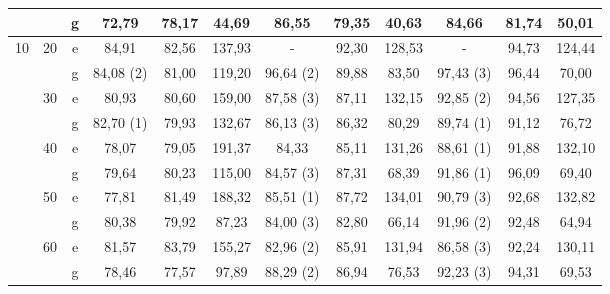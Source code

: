 \begin{table}[!h]
{\begin{tabular}{|c|c|c||ccc|ccc|ccc|}
          &       & g     & 	72,79  & 78,17 & 44,69 & 	86,55  & 79,35 & 40,63 & 	84,66 & 81,74 & 50,01 \bigstrut[b]\\
    \hline
    \hline
    \multirow{10}[10]{*}{10} & \multirow{2}[2]{*}{20} & e     & 	84,91  & 82,56 & 137,93 & \textcolor[rgb]{ 1,  0,  0}{ - } & 92,30 & 128,53 & \textcolor[rgb]{ 1,  0,  0}{ -} & 94,73 & 124,44 \bigstrut[t]\\
          &       & g     & \textcolor[rgb]{ 1,  0,  0}{ 84,08 (2) } & 81,00 & 119,20 & \textcolor[rgb]{ 1,  0,  0}{ 96,64 (2) } & 89,88 & 83,50 & \textcolor[rgb]{ 1,  0,  0}{ 97,43 (3)} & 96,44 & 70,00 \bigstrut[b]\\
\cline{2-12}          & \multirow{2}[2]{*}{30} & e     &  80,93  & 80,60 & 159,00 & \textcolor[rgb]{ 1,  0,  0}{ 87,58 (3) } & 87,11 & 132,15 & \textcolor[rgb]{ 1,  0,  0}{ 92,85 (2)} & 94,56 & 127,35 \bigstrut[t]\\
          &       & g     & \textcolor[rgb]{ 1,  0,  0}{ 82,70 (1) } & 79,93 & 132,67 & \textcolor[rgb]{ 1,  0,  0}{ 86,13 (3) } & 86,32 & 80,29 & \textcolor[rgb]{ 1,  0,  0}{	89,74 (1)} & 91,12 & 76,72 \bigstrut[b]\\
\cline{2-12}          & \multirow{2}[2]{*}{40} & e     &  78,07  & 79,05 & 191,37 & 	84,33  & 85,11 & 131,26 & \textcolor[rgb]{ 1,  0,  0}{ 88,61 (1)} & 91,88 & 132,10 \bigstrut[t]\\
          &       & g     &  79,64  & 80,23 & 115,00 & \textcolor[rgb]{ 1,  0,  0}{ 84,57 (3) } & 87,31 & 68,39 & \textcolor[rgb]{ 1,  0,  0}{	91,86 (1)} & 96,09 & 69,40 \bigstrut[b]\\
\cline{2-12}          & \multirow{2}[2]{*}{50} & e     &  77,81  & 81,49 & 188,32 & \textcolor[rgb]{ 1,  0,  0}{	85,51 (1) } & 87,72 & 134,01 & \textcolor[rgb]{ 1,  0,  0}{ 90,79 (3)} & 92,68 & 132,82 \bigstrut[t]\\
          &       & g     & 	80,38  & 79,92 & 87,23 & \textcolor[rgb]{ 1,  0,  0}{84,00 (3)} & 82,80 & 66,14 & \textcolor[rgb]{ 1,  0,  0}{	91,96 (2)} & 92,48 & 64,94 \bigstrut[b]\\
\cline{2-12}          & \multirow{2}[2]{*}{60} & e     &  81,57  & 83,79 & 155,27 & \textcolor[rgb]{ 1,  0,  0}{	82,96 (2) } & 85,91 & 131,94 & \textcolor[rgb]{ 1,  0,  0}{ 86,58 (3)} & 92,24 & 130,11 \bigstrut[t]\\
          &       & g     & 	78,46  & 77,57 & 97,89 & \textcolor[rgb]{ 1,  0,  0}{	88,29 (2) } & 86,94 & 76,53 & \textcolor[rgb]{ 1,  0,  0}{	92,23 (3)} & 94,31 & 69,53 \bigstrut[b]\\
    \hline
    \end{tabular}}%
  \label{table:apptab2}%
\end{table}%


